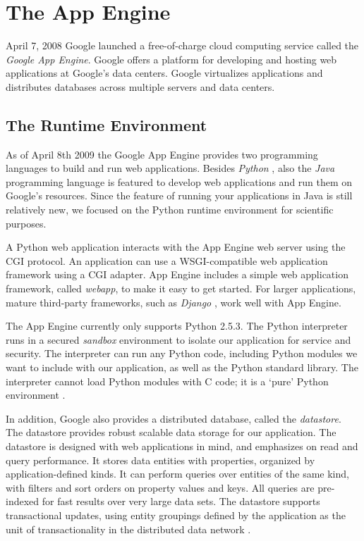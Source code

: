 \section{The App Engine}
\label{appengine}
April 7, 2008 Google launched a free-of-charge cloud computing service called
the \emph{Google App Engine}. Google offers a platform for developing and
hosting web applications at Google's data centers. Google virtualizes
applications and distributes databases across multiple servers and data centers.

\subsection{The Runtime Environment}
As of April 8th 2009 \cite{app-engine-java} the Google App Engine provides two
programming languages to build and run web applications. Besides \emph{Python}
\cite{python-www}, also the \emph{Java} \cite{java-www} programming language is
featured to develop web applications and run them on Google's resources. Since
the feature of running your applications in Java is still relatively new, we
focused on the Python runtime environment for scientific purposes.

A Python web application interacts with the App Engine web server using the CGI
protocol. An application can use a WSGI-compatible web application framework
using a CGI adapter. App Engine includes a simple web application framework,
called \emph{webapp}, to make it easy to get started. For larger applications,
mature third-party frameworks, such as \emph{Django} \cite{django-www}, work
well with App Engine.

The App Engine currently only supports Python 2.5.3. The Python interpreter runs
in a secured \emph{sandbox} environment to isolate our application for service
and security. The interpreter can run any Python code, including Python modules we
want to  include with our application, as well as the Python standard library.
The interpreter cannot load Python modules with C code; it is a `pure' Python
environment \cite{app-engine-sandbox}.

In addition, Google also provides a distributed database, called the
\emph{datastore}. The datastore provides robust scalable data storage for our
application. The datastore is designed with web applications in mind, and
emphasizes on read and query performance. It stores data entities with
properties, organized by application-defined kinds. It can perform queries over entities of
the same kind, with filters and sort orders on property values and keys. All
queries are pre-indexed for fast results over very large data sets. The datastore
supports transactional updates, using entity groupings defined by the application
as the unit of transactionality in the distributed data network
\cite{app-engine-datastore}.

